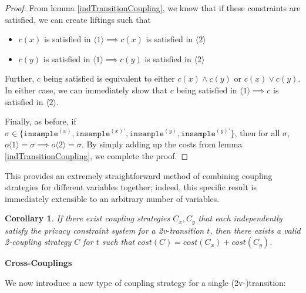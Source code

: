 \documentclass[12pt]{article}
\newcommand{\brangle}[1]{\langle#1 \rangle}
\newtheorem{cor}[thm]{Corollary}
\theoremstyle{definition}
\begin{document}
\begin{proof}
    From lemma \ref{indTransitionCoupling}, we know that if these constraints are satisfied, we can create liftings such that \begin{itemize}
        \item $c(x)$ is satisfied in $\brangle{1}\implies c(x)$ is satisfied in $\brangle{2}$
        \item $c(y)$ is satisfied in $\brangle{1}\implies c(y)$ is satisfied in $\brangle{2}$
    \end{itemize}
    Further, $c$ being satisfied is equivalent to either $c(x)\land c(y)$ or $c(x)\lor c(y)$. In either case, we can immediately show that $c$ being satisfied in $\brangle{1}\implies c$ is satisfied in $\brangle{2}$.

    Finally, as before, if $\sigma \in \{\texttt{insample}^{(x)}, \texttt{insample}^{(x)\prime}, \texttt{insample}^{(y)},\texttt{insample}^{(y)\prime}\}$, then for all $\sigma$, $o\brangle{1}=\sigma \implies o\brangle{2} = \sigma$. By simply adding up the costs from lemma \ref{indTransitionCoupling}, we complete the proof.
\end{proof}

This provides an extremely straightforward method of combining coupling strategies for different variables together; indeed, this specific result is immediately extensible to an arbitrary number of variables. 

\begin{cor}
    If there exist coupling strategies $C_x, C_y$ that each independently satisfy the privacy constraint system for a 2v-transition $t$, then there exists a valid 2-coupling strategy $C$ for $t$ such that $cost(C) = cost(C_x)+cost(C_y)$. 
\end{cor}

\textbf{Cross-Couplings}

We now introduce a new type of coupling strategy for a single (2v-)transition:
\end{document}
